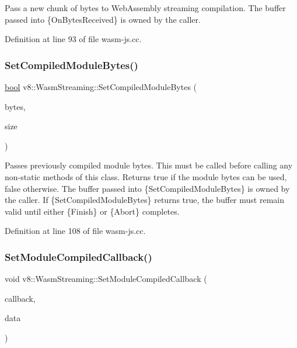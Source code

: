 Pass a new chunk of bytes to Web\+Assembly streaming compilation. The buffer passed into \{On\+Bytes\+Received\} is owned by the caller. 

Definition at line 93 of file wasm-\/js.\+cc.

\mbox{\label{classv8_1_1WasmStreaming_a73a233057ae54177e84d259f43a1781e}} 
\subsubsection{\texorpdfstring{Set\+Compiled\+Module\+Bytes()}{SetCompiledModuleBytes()}}
{\footnotesize\ttfamily \mbox{\hyperlink{classbool}{bool}} v8\+::\+Wasm\+Streaming\+::\+Set\+Compiled\+Module\+Bytes (\begin{DoxyParamCaption}\item[{const uint8\+\_\+t $\ast$}]{bytes,  }\item[{\mbox{\hyperlink{classsize__t}{size\+\_\+t}}}]{size }\end{DoxyParamCaption})}

Passes previously compiled module bytes. This must be called before calling any non-\/static methods of this class. Returns true if the module bytes can be used, false otherwise. The buffer passed into \{Set\+Compiled\+Module\+Bytes\} is owned by the caller. If \{Set\+Compiled\+Module\+Bytes\} returns true, the buffer must remain valid until either \{Finish\} or \{Abort\} completes. 

Definition at line 108 of file wasm-\/js.\+cc.

\mbox{\label{classv8_1_1WasmStreaming_a3ab2155ed7ae2cce343e634aa46e906b}} 
\subsubsection{\texorpdfstring{Set\+Module\+Compiled\+Callback()}{SetModuleCompiledCallback()}}
{\footnotesize\ttfamily void v8\+::\+Wasm\+Streaming\+::\+Set\+Module\+Compiled\+Callback (\begin{DoxyParamCaption}\item[{\mbox{\hyperlink{classv8_1_1WasmStreaming_a2e8af849348cbd9fe9c3940ab010917d}{Module\+Compiled\+Callback}}}]{callback,  }\item[{intptr\+\_\+t}]{data }\end{DoxyParamCaption})}

